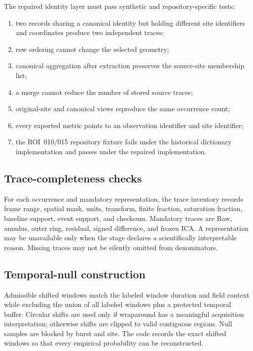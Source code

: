 The repaired identity layer must pass synthetic and repository-specific tests:
\begin{enumerate}
  \item two records sharing a canonical identity but holding different site identifiers and coordinates produce two independent traces;
  \item row ordering cannot change the selected geometry;
  \item canonical aggregation after extraction preserves the source-site membership list;
  \item a merge cannot reduce the number of stored source traces;
  \item original-site and canonical views reproduce the same occurrence count;
  \item every exported metric points to an observation identifier and site identifier;
  \item the ROI~010/015 repository fixture fails under the historical dictionary implementation and passes under the repaired implementation.
\end{enumerate}

\subsection{Trace-completeness checks}

For each occurrence and mandatory representation, the trace inventory records frame range, spatial mask, units, transform, finite fraction, saturation fraction, baseline support, event support, and checksum. Mandatory traces are Raw, annulus, outer ring, residual, signed difference, and frozen ICA. A representation may be unavailable only when the stage declares a scientifically interpretable reason. Missing traces may not be silently omitted from denominators.

\subsection{Temporal-null construction}

Admissible shifted windows match the labeled window duration and field context while excluding the union of all labeled windows plus a protected temporal buffer. Circular shifts are used only if wraparound has a meaningful acquisition interpretation; otherwise shifts are clipped to valid contiguous regions. Null samples are blocked by burst and site. The code records the exact shifted windows so that every empirical probability can be reconstructed.

